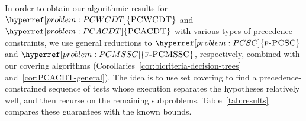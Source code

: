 \begingroup\setlength{\emergencystretch}{2em}
In order to obtain our algorithmic results for $\hyperref[problem:PCWCDT]{\ProblemPCWCDT}$ and $\hyperref[problem:PCACDT]{\ProblemPCACDT}$ with  various types of precedence constraints,
we use general reductions to $\hyperref[problem:PCSC]{\ProblemPCSC}$ and  $\hyperref[problem:PCMSSC]{\ProblemPCMSSC}$, respectively, combined with our covering algorithms (Corollaries~\ref{cor:bicriteria-decision-trees} and~\ref{cor:PCACDT-general}). The idea is to use set covering to find a precedence-constrained sequence of tests whose execution separates the hypotheses relatively well, and then recurse on the remaining subproblems. Table~\ref{tab:results} compares these guarantees with the known bounds. 


